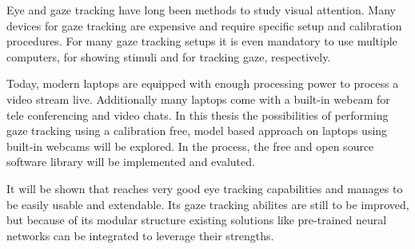 Eye and gaze tracking have long been methods to study visual attention. Many
devices for gaze tracking are expensive and require specific setup and
calibration procedures. For many gaze tracking setups it is even mandatory to
use multiple computers, for showing stimuli and for tracking gaze,
respectively.

Today, modern laptops are equipped with enough processing power to process a
video stream live. Additionally many laptops come with a built-in webcam for
tele conferencing and video chats. In this thesis the possibilities of
performing gaze tracking using a calibration free, model based approach on
laptops using built-in webcams will be explored. In the process, the free and
open source software library \Gaze{} will be implemented and evaluted.

It will be shown that \Gaze{} reaches very good eye tracking capabilities and
manages to be easily usable and extendable. Its gaze tracking abilites are
still to be improved, but because of its modular structure existing solutions
like pre-trained neural networks can be integrated to leverage their strengths.

